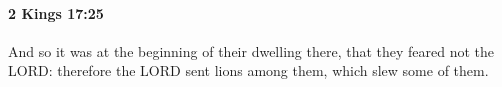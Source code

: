 
		\paragraph{2 Kings 17:25} %
			\label{2KINGS-17-25}

			And so it was at the beginning of their dwelling there, that they feared not the LORD: therefore the LORD sent lions among them, which slew some of them.


